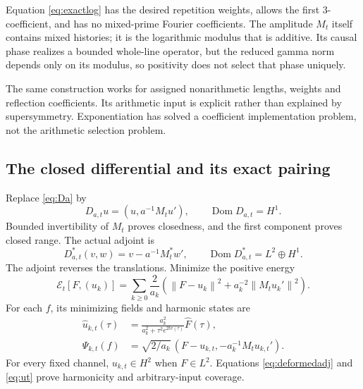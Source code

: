 \documentclass[11pt]{article}
\numberwithin{equation}{section}
\theoremstyle{definition}
\theoremstyle{remark}
\newcommand{\Dom}{\operatorname{Dom}}
\newcommand{\norm}[1]{\left\lVert#1\right\rVert}
\begin{document}
Equation \eqref{eq:exactlog} has the desired repetition weights, allows the first 3-coefficient, and has no mixed-prime Fourier coefficients. The amplitude $M_t$ itself contains mixed histories; it is the logarithmic modulus that is additive. Its causal phase realizes a bounded whole-line operator, but the reduced gamma norm depends only on its modulus, so positivity does not select that phase uniquely.

The same construction works for assigned nonarithmetic lengths, weights and reflection coefficients. Its arithmetic input is explicit rather than explained by supersymmetry. Exponentiation has solved a coefficient implementation problem, not the arithmetic selection problem.

\subsection{The closed differential and its exact pairing}
Replace \eqref{eq:Da} by
\begin{equation}
 D_{a,t}u=(u,a^{-1}M_tu'),\qquad\Dom D_{a,t}=H^1.
\end{equation}
Bounded invertibility of $M_t$ proves closedness, and the first component proves closed range. The actual adjoint is
\begin{equation}
 D_{a,t}^*(v,w)=v-a^{-1}M_t^*w',
 \qquad\Dom D_{a,t}^*=L^2\oplus H^1.
 \label{eq:deformedadj}
\end{equation}
The adjoint reverses the translations. Minimize the positive energy
\begin{equation}
 \mathcal E_t[F,(u_k)]
 =\sum_{k\ge0}\frac2{a_k}
 \left(\norm{F-u_k}^2+a_k^{-2}\norm{M_tu_k'}^2\right).
 \label{eq:Et}
\end{equation}
For each $f$, its minimizing fields and harmonic states are
\begin{align}
 \widehat u_{k,t}(\tau)&=
 \frac{a_k^2}{a_k^2+\tau^2e^{2tv(\tau)}}\widehat F(\tau),\label{eq:ut}\\
 \Psi_{k,t}(f)&=\sqrt{2/a_k}\,(F-u_{k,t},-a_k^{-1}M_tu_{k,t}').
\end{align}
For every fixed channel, $u_{k,t}\in H^2$ when $F\in L^2$. Equations \eqref{eq:deformedadj} and \eqref{eq:ut} prove harmonicity and arbitrary-input coverage.
\end{document}
